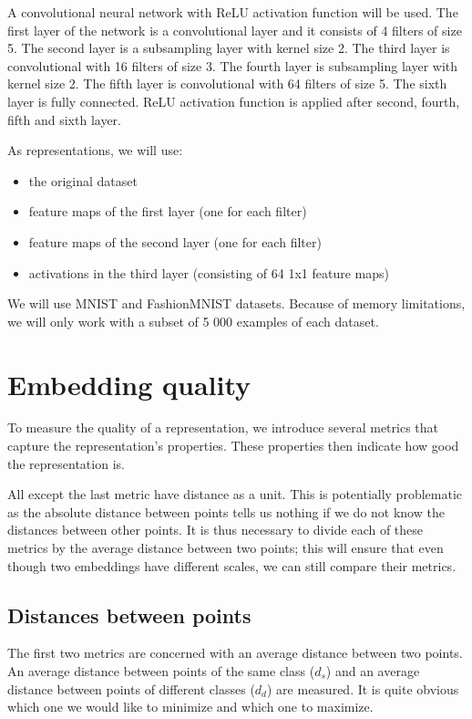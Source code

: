 \documentclass{article}
\begin{document}
A convolutional neural network with ReLU activation function will be used.
The first layer of the network is a convolutional layer and it consists of
4 filters of size 5. The second layer is a subsampling layer with kernel
size 2. The third layer is convolutional with 16 filters of size 3. The
fourth layer is subsampling layer with kernel size 2. The fifth layer
is convolutional with 64 filters of size 5. The sixth layer is fully
connected. ReLU activation function is applied after second, fourth, fifth
and sixth layer.

As representations, we will use:
\begin{itemize}
    \item the original dataset
    \item feature maps of the first layer (one for each filter)
    \item feature maps of the second layer (one for each filter)
    \item activations in the third layer (consisting of 64 1x1 feature maps)
\end{itemize}

We will use MNIST and FashionMNIST datasets. Because of memory limitations,
we will only work with a subset of 5 000 examples of each dataset.

\section{Embedding quality}
To measure the quality of a representation, we introduce several metrics that
capture the representation's properties. These properties then indicate how
good the representation is.

All except the last metric have distance as a unit. This is potentially
problematic as the absolute distance between points tells us nothing if we
do not know the distances between other points. It is thus necessary
to divide each of these metrics by the average distance between two points;
this will ensure that even though two embeddings have different scales, we
can still compare their metrics.

\subsection{Distances between points}
The first two metrics are concerned with an average distance between two points.
An average distance between points of the same class (\(d_s\)) and an average
distance between points of different classes (\(d_d\)) are measured. It is
quite obvious which one we would like to minimize and which one to maximize.
\end{document}

